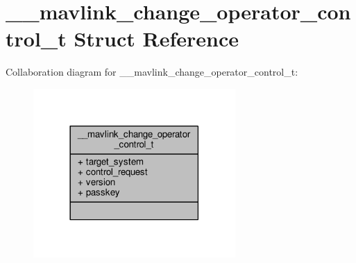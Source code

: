 \hypertarget{struct____mavlink__change__operator__control__t}{\section{\+\_\+\+\_\+mavlink\+\_\+change\+\_\+operator\+\_\+control\+\_\+t Struct Reference}
\label{struct____mavlink__change__operator__control__t}
}


Collaboration diagram for \+\_\+\+\_\+mavlink\+\_\+change\+\_\+operator\+\_\+control\+\_\+t\+:
\nopagebreak
\begin{figure}[H]
\begin{center}
\leavevmode
\includegraphics[width=218pt]{struct____mavlink__change__operator__control__t__coll__graph}
\end{center}
\end{figure}
